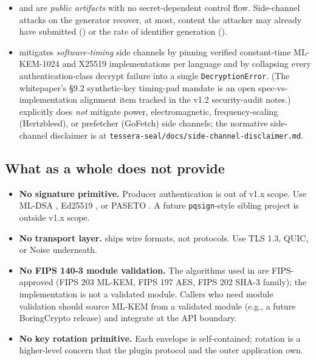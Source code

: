 \begin{itemize}
\item \tesseraid{} and \tesserahash{} are \emph{public artifacts} with no secret-dependent control flow. Side-channel attacks on the generator recover, at most, content the attacker may already have submitted (\tesserahash{}) or the rate of identifier generation (\tesseraid{}).
\item \tesseraseal{} mitigates \emph{software-timing} side channels by pinning verified constant-time ML-KEM-1024 and X25519 implementations per language and by collapsing every authentication-class decrypt failure into a single \texttt{DecryptionError}. (The \tesseraseal{} whitepaper's \S 9.2 synthetic-key timing-pad mandate is an open spec-vs-implementation alignment item tracked in the v1.2 security-audit notes.) \tesseraseal{} explicitly does \emph{not} mitigate power, electromagnetic, frequency-scaling (Hertzbleed), or prefetcher (GoFetch) side channels; the normative side-channel disclaimer is at \texttt{tessera-seal/docs/side-channel-disclaimer.md}.
\end{itemize}

\subsection{What \tessera{} as a whole does not provide}

\begin{itemize}
\item \textbf{No signature primitive.} Producer authentication is out of v1.x scope. Use ML-DSA \citep{fips204}, Ed25519 \citep{rfc8032}, or PASETO \citep{paseto-v4}. A future \texttt{pqsign}-style sibling project is outside v1.x scope.
\item \textbf{No transport layer.} \tessera{} ships wire formats, not protocols. Use TLS 1.3, QUIC, or Noise underneath.
\item \textbf{No FIPS 140-3 module validation.} The algorithms used in \tesseraseal{} are FIPS-approved (FIPS 203 ML-KEM, FIPS 197 AES, FIPS 202 SHA-3 family); the implementation is not a validated module. Callers who need module validation should source ML-KEM from a validated module (e.g., a future BoringCrypto release) and integrate at the API boundary.
\item \textbf{No key rotation primitive.} Each \tesseraseal{} envelope is self-contained; rotation is a higher-level concern that the plugin protocol and the outer application own.
\end{itemize}

